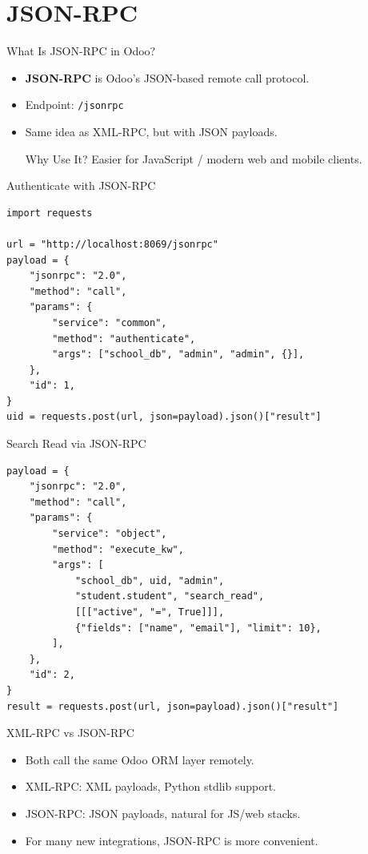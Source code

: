 \section{JSON-RPC}

\begin{frame}[fragile]{What Is JSON-RPC in Odoo?}
	\begin{itemize}
		\item \textbf{JSON-RPC} is Odoo's JSON-based remote call protocol.
		\item Endpoint: \texttt{/jsonrpc}
		\item Same idea as XML-RPC, but with JSON payloads.
\begin{block}{Why Use It?}
	Easier for JavaScript / modern web and mobile clients.
\end{block}
	\end{itemize}
\end{frame}

\begin{frame}[fragile]{Authenticate with JSON-RPC}
\begin{lstlisting}
import requests

url = "http://localhost:8069/jsonrpc"
payload = {
	"jsonrpc": "2.0",
	"method": "call",
	"params": {
		"service": "common",
		"method": "authenticate",
		"args": ["school_db", "admin", "admin", {}],
	},
	"id": 1,
}
uid = requests.post(url, json=payload).json()["result"]
\end{lstlisting}
\end{frame}

\begin{frame}[fragile]{Search Read via JSON-RPC}
\begin{lstlisting}
payload = {
	"jsonrpc": "2.0",
	"method": "call",
	"params": {
		"service": "object",
		"method": "execute_kw",
		"args": [
			"school_db", uid, "admin",
			"student.student", "search_read",
			[[["active", "=", True]]],
			{"fields": ["name", "email"], "limit": 10},
		],
	},
	"id": 2,
}
result = requests.post(url, json=payload).json()["result"]
\end{lstlisting}
\end{frame}

\begin{frame}[fragile]{XML-RPC vs JSON-RPC}
	\begin{itemize}
		\item Both call the same Odoo ORM layer remotely.
		\item XML-RPC: XML payloads, Python stdlib support.
		\item JSON-RPC: JSON payloads, natural for JS/web stacks.
		\item For many new integrations, JSON-RPC is more convenient.
	\end{itemize}
\end{frame}

